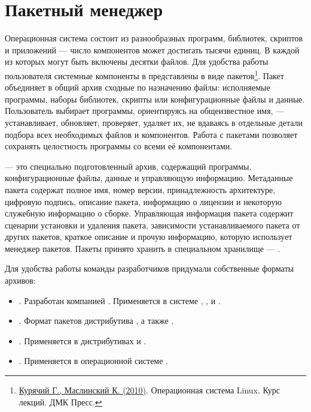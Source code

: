 \chapter{Пакетный менеджер}\label{package-manager}
Операционная система состоит из разнообразных программ, библиотек, скриптов и приложений ---
число компонентов может достигать тысячи единиц. В каждой из которых могут быть включены десятки файлов.
Для удобства работы пользователя системные компоненты в  представлены в виде
пакетов\footnote{\href{https://docs.altlinux.org/books/altlibrary-linuxintro2.pdf}{Курячий Г., Маслинский К. (2010)}.
	Операционная система Linux. Курс лекций. ДМК Пресс.}. Пакет объединяет в общий архив сходные по назначению файлы: исполняемые программы, наборы библиотек, скрипты или конфигурационные файлы и данные.
Пользователь выбирает программы, ориентируясь на общеизвестное имя, --- устанавливает, обновляет, проверяет,
удаляет их, не вдаваясь в отдельные детали подбора всех необходимых файлов и компонентов.
Работа с пакетами позволяет сохранять целостность программы со всеми её компонентами.

 --- это специально подготовленный архив, содержащий программы, конфигурационные файлы,
данные и управляющую информацию. Метаданные пакета содержат полное имя, номер версии, принадлежность
архитектуре, цифровую подпись, описание пакета, информацию о лицензии и некоторую служебную информацию
о сборке. Управляющая информация пакета содержит сценарии установки и удаления пакета, зависимости
устанавливаемого пакета от других пакетов, краткое описание и прочую информацию, которую использует
менеджер пакетов. Пакеты принято хранить в специальном хранилище --- .

Для удобства работы команды разработчиков придумали собственные форматы архивов:

\begin{itemize}
	\item {}. Разработан компанией . Применяется в системе , ,  и .
	\item {}. Формат пакетов дистрибутива , а также .
	\item {}. Применяется в дистрибутивах  и .
	\item {}. Применяется в операционной системе .
\end{itemize}

